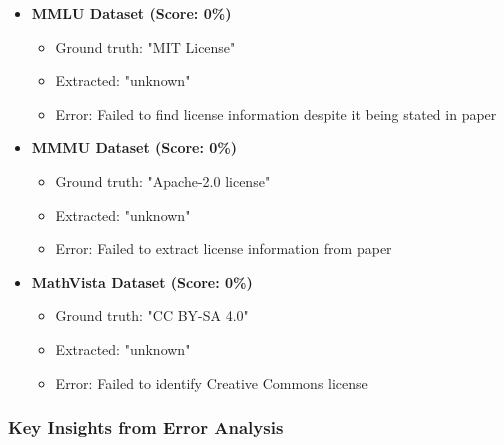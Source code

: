 \documentclass[11pt,a4paper]{article}
\begin{document}
\begin{itemize}[leftmargin=*]
    \item \textbf{MMLU Dataset (Score: 0\%)}
    \begin{itemize}
        \item Ground truth: "MIT License"
        \item Extracted: "unknown"
        \item Error: Failed to find license information despite it being stated in paper
    \end{itemize}

    \item \textbf{MMMU Dataset (Score: 0\%)}
    \begin{itemize}
        \item Ground truth: "Apache-2.0 license"
        \item Extracted: "unknown"
        \item Error: Failed to extract license information from paper
    \end{itemize}

    \item \textbf{MathVista Dataset (Score: 0\%)}
    \begin{itemize}
        \item Ground truth: "CC BY-SA 4.0"
        \item Extracted: "unknown"
        \item Error: Failed to identify Creative Commons license
    \end{itemize}
\end{itemize}

\subsubsection{Key Insights from Error Analysis}
\end{document}
